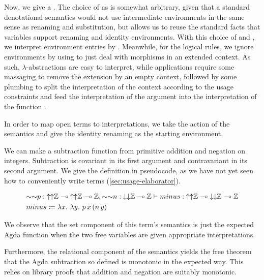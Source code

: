 
Now, we give a .
The choice of \AgdaBound{$\V$} as
\AgdaRecord{\AgdaUnderscore{}$\sqni$\AgdaUnderscore{}} is somewhat arbitrary,
given that a standard denotational semantics would not use intermediate
environments in the same sense as renaming and substitution, but allows us to
reuse the standard facts that variables support renaming and identity
environments.
With this choice of \AgdaBound{$\V$} and \AgdaBound{$\C$}, we interpret
environment entries by .
Meanwhile, for the logical rules, we ignore environments by using
 to just deal with morphisms in an extended context.
As such, $\lambda$-abstractions are easy to interpret, while applications
require some massaging to remove the extension by an empty context, followed by
some plumbing to split the interpretation of the context according to the usage
constraints and feed the interpretation of the argument  into
the interpretation of the function .


In order to map open terms to interpretations, we take the action of the
semantics and give the identity renaming as the starting environment.


\begin{example}
  We can make a subtraction function from primitive addition and negation on
  integers.
  Subtraction is covariant in its first argument and contravariant in its
  second argument.
  We give the definition in pseudocode, as we have not yet seen how to
  conveniently write terms (\cref{sec:usage-elaborator}).

  \begin{align*}
    &{\sim\sim}p :
      {\uparrow\uparrow}\mathbb Z \multimap
      {\uparrow\uparrow}\mathbb Z \multimap \mathbb Z,
      {\sim\sim}n : {\downarrow\downarrow}\mathbb Z \multimap \mathbb Z
      \vdash \mathnormal{minus} :
      {\uparrow\uparrow}\mathbb Z \multimap
      {\downarrow\downarrow}\mathbb Z \multimap
      \mathbb Z
    \\
    &\mathnormal{minus} \coloneqq \lambda x.~\lambda y.~p\,x\,(n\,y)
  \end{align*}

  We observe that the set component of this term's semantics is just the
  expected Agda function when the two free variables are given appropriate
  interpretations.


  Furthermore, the relational component of the semantics yields the free
  theorem that the Agda subtraction so defined is monotonic in the expected way.
  This relies on library proofs that addition and negation are suitably
  monotonic.

\end{example}

